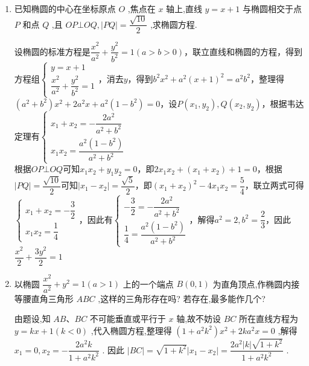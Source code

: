 \begin{enumerate}
    \item 已知椭圆的中心在坐标原点 ${O}$ ,焦点在 $x$ 轴上,直线 $y = x + 1$ 与椭圆相交于点 $P$ 和点 $Q$ ,且 ${OP} \bot  {OQ},\left| {PQ}\right|  = \dfrac{\sqrt{10}}{2}$ ,求椭圆方程.

    \begin{jieda}
        设椭圆的标准方程是$\dfrac{x^2}{a^2}+\dfrac{y^2}{b^2} = 1(a > b > 0)$，联立直线和椭圆的方程，得到方程组$\left\{\begin{array}{l}
             y = x + 1 \\
             \dfrac{x^2}{a^2}+\dfrac{y^2}{b^2} = 1
        \end{array}\right.$，消去$y$，得到$b^2x^2+a^2(x+1)^2 = a^2b^2$，整理得$(a^2+b^2)x^2+2a^2x+a^2(1-b^2) = 0$，设$P(x_1, y_2), Q(x_2, y_2)$，根据韦达定理有$\left\{\begin{array}{l}
             x_1+x_2 = -\dfrac{2a^2}{a^2+b^2} \\
             x_1x_2 = \dfrac{a^2(1-b^2)}{a^2+b^2}
        \end{array}\right.$\\
        根据${OP} \bot  {OQ}$可知$x_1x_2+y_1y_2 = 0$，即$2x_1x_2+(x_1+x_2)+1 = 0$，根据$\left| {PQ}\right|  = \dfrac{\sqrt{10}}{2}$可知$|x_1-x_2| = \dfrac{\sqrt{5}}{2}$，即$(x_1+x_2)^2-4x_1x_2 = \dfrac{5}{4}$，联立两式可得$\left\{\begin{array}{l}
             x_1+x_2 = -\dfrac{3}{2} \\
             x_1x_2 = \dfrac{1}{4}
        \end{array}\right.$，因此有$\left\{\begin{array}{l}
             -\dfrac{3}{2} = -\dfrac{2a^2}{a^2+b^2} \\
             \dfrac{1}{4} = \dfrac{a^2(1-b^2)}{a^2+b^2}
        \end{array}\right.$，解得$a^2 = 2, b^2 = \dfrac{2}{3}$，因此$\dfrac{x^2}{2}+\dfrac{3y^2}{2} = 1$
    \end{jieda}
    
    \item 以椭圆 $\dfrac{{x}^{2}}{{a}^{2}} + {y}^{2} = 1\left( {a > 1}\right)$ 上的一个端点 $B\left( {0,1}\right)$ 为直角顶点,作椭圆内接等腰直角三角形 ${ABC}$ ,这样的三角形存在吗? 若存在,最多能作几个?
    \begin{jieda}
        由题设,知 ${AB}\text{、}{BC}$ 不可能垂直或平行于 $x$ 轴,故不妨设 ${BC}$ 所在直线方程为 $y = {kx} + 1\left( {k < 0}\right)$ ,代入椭圆方程,整理得 $\left( {1 + {a}^{2}{k}^{2}}\right) {x}^{2} + {2k}{a}^{2}x = 0$ ,解得${x}_{1} = 0,{x}_{2} =  - \dfrac{2{a}^{2}k}{1 + {a}^{2}{k}^{2}}$ . 因此 $\left| {BC}\right|  = \sqrt{1 + {k}^{2}}\left| {{x}_{1} - {x}_{2}}\right|  = \dfrac{2{a}^{2}\left| k\right| \sqrt{1 + {k}^{2}}}{1 + {a}^{2}{k}^{2}}$ . 
        

\end{jieda}
\end{enumerate}
